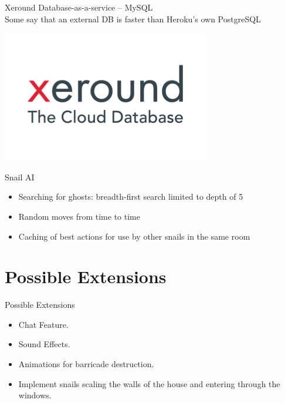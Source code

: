 \documentclass{beamer}
\begin{document}
\begin{frame}{Xeround}
  Database-as-a-service -- MySQL \\
  \vspace{\baselineskip}
  Some say that an external DB is faster than Heroku's own PostgreSQL
  \vspace{\baselineskip}
  \begin{center}
    \includegraphics[scale=0.25]{xeround.png} \\
  \end{center}
\end{frame}

\begin{frame}{Snail AI}
  \begin{itemize}
    \item Searching for ghosts: breadth-first search limited to depth of 5
    \vspace{\baselineskip}
    \item Random moves from time to time
    \vspace{\baselineskip}
    \item Caching of best actions for use by other snails in the same room
  \end{itemize}
\end{frame}

\section{Possible Extensions}
\begin{frame}{Possible Extensions}
  \begin{itemize}
    \item Chat Feature.
    \vspace{\baselineskip}
    \item Sound Effects.
    \vspace{\baselineskip}
    \item Animations for barricade destruction.
    \vspace{\baselineskip}
    \item Implement snails scaling the walls of the house and entering through the windows.
  \end{itemize}
\end{frame}
\end{document}
